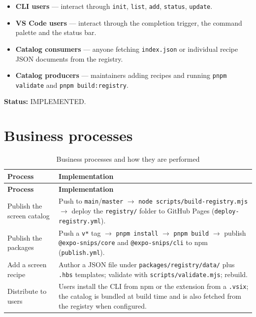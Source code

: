 \begin{itemize}
  \item \textbf{CLI users} --- interact through \texttt{init}, \texttt{list},
        \texttt{add}, \texttt{status}, \texttt{update}.
  \item \textbf{VS Code users} --- interact through the completion trigger, the
        command palette and the status bar.
  \item \textbf{Catalog consumers} --- anyone fetching \texttt{index.json} or
        individual recipe JSON documents from the registry.
  \item \textbf{Catalog producers} --- maintainers adding recipes and running
        \texttt{pnpm validate} and \texttt{pnpm build:registry}.
\end{itemize}

\textbf{Status:} IMPLEMENTED.

\section{Business processes}

\begin{longtable}{@{}L{4cm}L{10.4cm}@{}}
\caption{Business processes and how they are performed}\\
\toprule
\textbf{Process} & \textbf{Implementation} \\
\midrule
\endfirsthead
\toprule
\textbf{Process} & \textbf{Implementation} \\
\midrule
\endhead
Publish the screen catalog & Push to \texttt{main}/\texttt{master} $\rightarrow$ \texttt{node scripts/build-registry.mjs} $\rightarrow$ deploy the \texttt{registry/} folder to GitHub Pages (\texttt{deploy-registry.yml}). \\
Publish the packages & Push a \texttt{v*} tag $\rightarrow$ \texttt{pnpm install} $\rightarrow$ \texttt{pnpm build} $\rightarrow$ publish \texttt{@expo-snips/core} and \texttt{@expo-snips/cli} to npm (\texttt{publish.yml}). \\
Add a screen recipe & Author a JSON file under \texttt{packages/registry/data/} plus \texttt{.hbs} templates; validate with \texttt{scripts/validate.mjs}; rebuild. \\
Distribute to users & Users install the CLI from npm or the extension from a \texttt{.vsix}; the catalog is bundled at build time and is also fetched from the registry when configured. \\
\bottomrule
\end{longtable}

